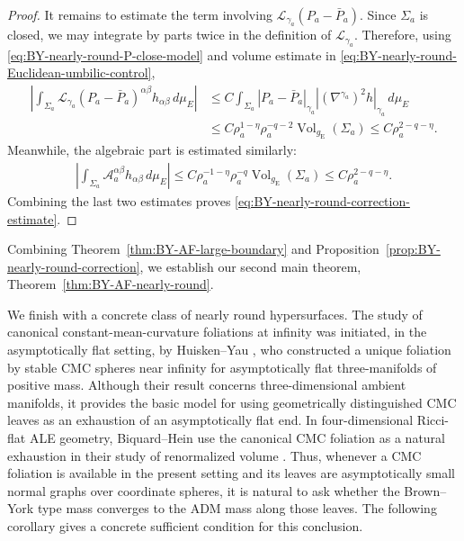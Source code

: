 \documentclass[10pt,a4paper]{amsart}
\newcommand{\gE}{g_{\mathrm{E}}}
\newcommand{\Vol}{\operatorname{Vol}}
\begin{document}
\begin{proof}
		It remains to estimate the term involving
		$\mathcal L_{\gamma_a}(P_a-\bar P_a)$. Since $\Sigma_a$ is closed, we may
		integrate by parts twice in the definition of $\mathcal L_{\gamma_a}$. Therefore,
		using \eqref{eq:BY-nearly-round-P-close-model} and volume estimate in \eqref{eq:BY-nearly-round-Euclidean-umbilic-control},
		\begin{align*}
			\left|
			\int_{\Sigma_a}
			\mathcal L_{\gamma_a}(P_a-\bar P_a)^{\alpha\beta}
			h_{\alpha\beta}\,d\mu_E
			\right|
			&
			\leq
			C\int_{\Sigma_a}
			|P_a-\bar P_a|_{\gamma_a}
			|(\nabla^{\gamma_a})^2h|_{\gamma_a}\,d\mu_E\\
			&
			\leq
			C\rho_a^{1-\eta}\rho_a^{-q-2}\Vol_{\gE}(\Sigma_a)
			\leq
			C\rho_a^{2-q-\eta}.
		\end{align*}
		Meanwhile, the algebraic part is estimated similarly:
		\begin{align*}
			\left|
			\int_{\Sigma_a}
			\mathcal A_a^{\alpha\beta}
			h_{\alpha\beta}\,d\mu_E
			\right|
			\leq
			C\rho_a^{-1-\eta}\rho_a^{-q}\Vol_{\gE}(\Sigma_a)
			\leq
			C\rho_a^{2-q-\eta}.
		\end{align*}
		Combining the last two estimates proves
		\eqref{eq:BY-nearly-round-correction-estimate}.
	\end{proof}
	
	Combining Theorem~\ref{thm:BY-AF-large-boundary} and Proposition~\ref{prop:BY-nearly-round-correction}, we establish our second main theorem, Theorem~\ref{thm:BY-AF-nearly-round}.
	
	\medskip
	
	We finish with a concrete class of nearly round hypersurfaces. The study of canonical constant-mean-curvature foliations at infinity was
	initiated, in the asymptotically flat setting, by Huisken--Yau
	\cite{HuiskenYau}, who constructed a unique foliation by stable CMC spheres near infinity for asymptotically flat three-manifolds of positive mass.
	Although their result concerns three-dimensional ambient manifolds, it
	provides the basic model for using geometrically distinguished CMC leaves as
	an exhaustion of an asymptotically flat end.  In four-dimensional Ricci-flat
	ALE geometry, Biquard--Hein use the canonical CMC foliation as a natural
	exhaustion in their study of renormalized volume \cite{BH}.  Thus, whenever a
	CMC foliation is available in the present setting and its leaves are
	asymptotically small normal graphs over coordinate spheres, it is natural to
	ask whether the Brown--York type mass converges to the ADM mass along those
	leaves.  The following corollary gives a concrete sufficient condition for
	this conclusion.
	
\end{document}
